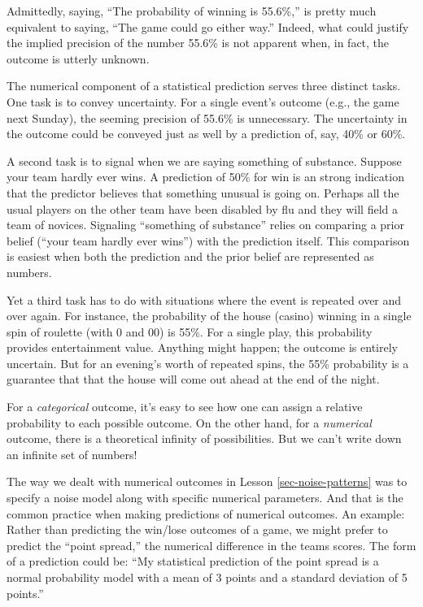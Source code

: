 \documentclass[
  letterpaper,
  DIV=11,
  numbers=noendperiod,
  oneside]{scrartcl}
\begin{document}
Admittedly, saying, ``The probability of winning is 55.6\%,'' is pretty
much equivalent to saying, ``The game could go either way.'' Indeed,
what could justify the implied precision of the number 55.6\% is not
apparent when, in fact, the outcome is utterly unknown.

The numerical component of a statistical prediction serves three
distinct tasks. One task is to convey uncertainty. For a single event's
outcome (e.g., the game next Sunday), the seeming precision of 55.6\% is
unnecessary. The uncertainty in the outcome could be conveyed just as
well by a prediction of, say, 40\% or 60\%.

A second task is to signal when we are saying something of substance.
Suppose your team hardly ever wins. A prediction of 50\% for win is an
strong indication that the predictor believes that something unusual is
going on. Perhaps all the usual players on the other team have been
disabled by flu and they will field a team of novices. Signaling
``something of substance'' relies on comparing a prior belief (``your
team hardly ever wins'') with the prediction itself. This comparison is
easiest when both the prediction and the prior belief are represented as
numbers.

Yet a third task has to do with situations where the event is repeated
over and over again. For instance, the probability of the house (casino)
winning in a single spin of roulette (with 0 and 00) is 55\%. For a
single play, this probability provides entertainment value. Anything
might happen; the outcome is entirely uncertain. But for an evening's
worth of repeated spins, the 55\% probability is a guarantee that that
the house will come out ahead at the end of the night.

For a \emph{categorical} outcome, it's easy to see how one can assign a
relative probability to each possible outcome. On the other hand, for a
\emph{numerical} outcome, there is a theoretical infinity of
possibilities. But we can't write down an infinite set of numbers!

The way we dealt with numerical outcomes in Lesson
\ref{sec-noise-patterns} was to specify a noise model along with
specific numerical parameters. And that is the common practice when
making predictions of numerical outcomes. An example: Rather than
predicting the win/lose outcomes of a game, we might prefer to predict
the ``point spread,'' the numerical difference in the teams scores. The
form of a prediction could be: ``My statistical prediction of the point
spread is a normal probability model with a mean of 3 points and a
standard deviation of 5 points.''
\end{document}
